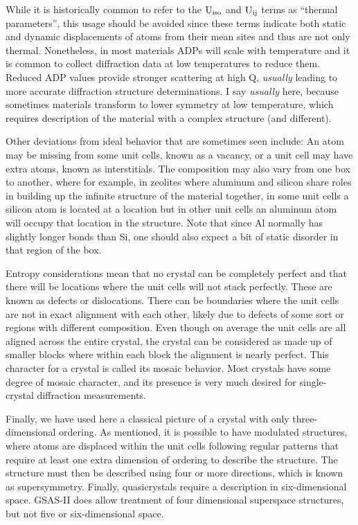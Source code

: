  While it is historically common to refer to the $\rm U_{iso}$ and $\rm U_{ij}$ terms as ``thermal parameters'', this usage should be avoided since these terms indicate both static and dynamic displacements of atoms from their mean sites and thus are not only thermal. Nonetheless, in most materials ADPs will scale with temperature and it is common to collect diffraction data at low temperatures to reduce them. Reduced ADP values provide stronger scattering at high Q, \textit{usually} leading to more accurate diffraction structure determinations. I say \textit{usually} here, because sometimes materials transform to lower symmetry at low temperature, which requires description of the material with a complex structure (and different).

 Other deviations from ideal behavior that are sometimes seen include: An atom may be missing from some unit cells, known as a vacancy, or a unit cell may have extra atoms, known as interstitials. The composition may also vary from one box to another, where for example, in zeolites where aluminum and silicon share roles in building up the infinite structure of the material together, in some unit cells a silicon atom is located at a location but in other unit cells an aluminum atom will occupy that location in the structure. Note that since Al normally has slightly longer bonds than Si, one should also expect a bit of static disorder in that region of the box. 

 Entropy considerations mean that no crystal can be completely perfect and that there will be locations where the unit cells will not stack perfectly. These are known as defects or dislocations. There can be boundaries where the unit cells are not in exact alignment with each other, likely due to defects of some sort or regions with different composition. Even though on average the unit cells are all aligned across the entire crystal, the crystal can be considered as made up of smaller blocks where within each block the alignment is nearly perfect. This character for a crystal is called its mosaic behavior. Most crystals have some degree of mosaic character, and its presence is very much desired for single-crystal diffraction measurements. 

 Finally, we have used here a classical picture of a crystal with only three-dimensional ordering. As mentioned, it is possible to have modulated structures, where atoms are displaced within the unit cells following regular patterns that require at least one extra dimension of ordering to describe the structure. The structure must then be described using four or more directions, which is known as supersymmetry. Finally, quasicrystals require a description in six-dimensional space. GSAS-II does allow treatment of four dimensional superspace structures, but not five or six-dimensional space. 

